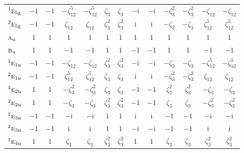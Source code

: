 \documentclass[10pt,a4paper]{article}
\numberwithin{equation}{section}
\newcommand{\irr}[1]{\text{\normalfont\scshape #1}}
\newcommand{\conjpair}[1]{{}^{#1}}
\newcommand{\ptag}[1]{\mathrm{#1}}
\newcommand{\iunit}{\mathrm{i}}
\newcommand{\rootunity}[1]{\zeta_{#1}}
\begin{document}
{\begin{longtable}{@{}lcccccccccccc@{}}
$\conjpair{1}\irr{e}_{5\ptag{g}}$ & $-1$ & $-1$ & $-\rootunity{12}^{5}$ & $-\rootunity{12}^{5}$ & $\rootunity{3}$ & $\rootunity{3}$ & $-\iunit{}$ & $-\iunit{}$ & $-\rootunity{3}^{2}$ & $-\rootunity{3}^{2}$ & $-\rootunity{12}$ & $-\rootunity{12}$\\
$\conjpair{2}\irr{e}_{5\ptag{g}}$ & $-1$ & $-1$ & $\rootunity{12}$ & $\rootunity{12}$ & $\rootunity{3}^{2}$ & $\rootunity{3}^{2}$ & $\iunit{}$ & $\iunit{}$ & $-\rootunity{3}$ & $-\rootunity{3}$ & $\rootunity{12}^{5}$ & $\rootunity{12}^{5}$\\
$\irr{a}_{\ptag{u}}$ & $1$ & $1$ & $1$ & $1$ & $1$ & $1$ & $1$ & $1$ & $1$ & $1$ & $1$ & $1$\\
$\irr{b}_{\ptag{u}}$ & $1$ & $1$ & $-1$ & $-1$ & $1$ & $1$ & $-1$ & $-1$ & $1$ & $1$ & $-1$ & $-1$\\
$\conjpair{1}\irr{e}_{1\ptag{u}}$ & $-1$ & $-1$ & $-\rootunity{12}$ & $-\rootunity{12}$ & $\rootunity{3}^{2}$ & $\rootunity{3}^{2}$ & $-\iunit{}$ & $-\iunit{}$ & $-\rootunity{3}$ & $-\rootunity{3}$ & $-\rootunity{12}^{5}$ & $-\rootunity{12}^{5}$\\
$\conjpair{2}\irr{e}_{1\ptag{u}}$ & $-1$ & $-1$ & $\rootunity{12}^{5}$ & $\rootunity{12}^{5}$ & $\rootunity{3}$ & $\rootunity{3}$ & $\iunit{}$ & $\iunit{}$ & $-\rootunity{3}^{2}$ & $-\rootunity{3}^{2}$ & $\rootunity{12}$ & $\rootunity{12}$\\
$\conjpair{1}\irr{e}_{2\ptag{u}}$ & $1$ & $1$ & $-\rootunity{3}^{2}$ & $-\rootunity{3}^{2}$ & $\rootunity{3}$ & $\rootunity{3}$ & $-1$ & $-1$ & $\rootunity{3}^{2}$ & $\rootunity{3}^{2}$ & $-\rootunity{3}$ & $-\rootunity{3}$\\
$\conjpair{2}\irr{e}_{2\ptag{u}}$ & $1$ & $1$ & $-\rootunity{3}$ & $-\rootunity{3}$ & $\rootunity{3}^{2}$ & $\rootunity{3}^{2}$ & $-1$ & $-1$ & $\rootunity{3}$ & $\rootunity{3}$ & $-\rootunity{3}^{2}$ & $-\rootunity{3}^{2}$\\
$\conjpair{1}\irr{e}_{3\ptag{u}}$ & $-1$ & $-1$ & $-\iunit{}$ & $-\iunit{}$ & $1$ & $1$ & $\iunit{}$ & $\iunit{}$ & $-1$ & $-1$ & $-\iunit{}$ & $-\iunit{}$\\
$\conjpair{2}\irr{e}_{3\ptag{u}}$ & $-1$ & $-1$ & $\iunit{}$ & $\iunit{}$ & $1$ & $1$ & $-\iunit{}$ & $-\iunit{}$ & $-1$ & $-1$ & $\iunit{}$ & $\iunit{}$\\
$\conjpair{1}\irr{e}_{4\ptag{u}}$ & $1$ & $1$ & $\rootunity{3}$ & $\rootunity{3}$ & $\rootunity{3}^{2}$ & $\rootunity{3}^{2}$ & $1$ & $1$ & $\rootunity{3}$ & $\rootunity{3}$ & $\rootunity{3}^{2}$ & $\rootunity{3}^{2}$\\

\end{longtable}}
\end{document}
